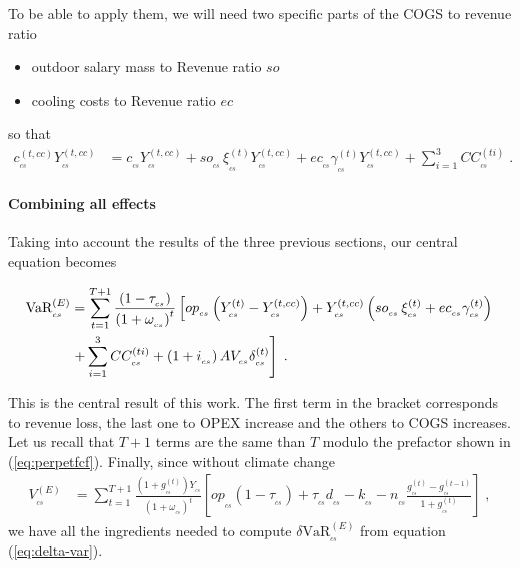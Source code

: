 To be able to apply them, we will need two specific parts of the COGS to revenue ratio
\begin{itemize}
\item[•] outdoor salary mass to Revenue ratio $so$
\item[•] cooling costs to Revenue ratio $ec$
\end{itemize}
so that
\begin{align}
c^{(t,cc)}_{_{cs}}Y^{(t,cc)}_{_{cs}}&=c_{_{cs}}Y^{(t,cc)}_{_{cs}}+so_{_{cs}}\, \xi^{(t)}_{_{cs}} Y^{(t,cc)}_{_{cs}}+ ec_{_{cs}} \gamma^{(t)}_{_{cs}}Y^{(t,cc)}_{_{cs}}
%
+\sum_{i=1}^3CC^{(ti)}_{_{cs}}\;.
\end{align}

\paragraph{Combining all effects}

Taking into account the results of the three previous sections, our central equation becomes

\vspace{0.1cm}

\begin{tcolorbox}[colback=red!5!white,colframe=red!70!black,title=\textbf{ClimVaR central formula},halign title=flush center]
\begin{align}
\text{VaR}^{(E)}_{_{cs}}&=
%
\sum_{t=1}^{T+1}
%
\frac{\left( 1-\tau_{_{cs}}\right)}{\left(1+\omega_{_{cs}}\right)^t}
%
\left[op_{_{cs}}\left(Y^{(t)}_{_{cs}}-Y^{(t,cc)}_{_{cs}}\right)
%
+Y^{(t,cc)}_{_{cs}}\left(so_{_{cs}}\, \xi^{(t)}_{_{cs}} + ec_{_{cs}} \gamma^{(t)}_{_{cs}}\right)
%
\right.\notag\\
%
&\left. +\sum_{i=1}^3CC^{(ti)}_{_{cs}}+\left(1+i_{_{cs}}\right) AV_{_{cs}} \delta^{(t)}_{_{cs}}
%
\right]\;.\label{eq:central2}
\end{align}
\end{tcolorbox}

\vspace{0.1cm}

This is the central result of this work. The first term in the bracket corresponds to revenue loss, the last one to OPEX increase and the others to COGS increases. Let us recall that $T+1$ terms are the same than $T$ modulo the prefactor shown in (\ref{eq:perpetfcf}). Finally, since without climate change
\begin{align}
V^{(E)}_{_{cs}}&=\sum_{t=1}^{T+1}\frac{\left(1+g^{(t)}_{_{cs}}\right)Y_{_{cs}}}{\left(1+\omega_{_{cs}}\right)^t}
%
\left[op_{_{cs}}\left(1-\tau_{_{cs}}\right)+\tau_{_{cs}} d_{_{cs}}-k_{_{cs}}-n_{_{cs}}\frac{g^{(t)}_{_{cs}}-g^{(t-1)}_{_{cs}}}{1+g^{(t)}_{_{cs}}} \right]\;,\label{eq:var-without-cc}
\end{align}
we have all the ingredients needed to compute $\delta \text{VaR}^{(E)}_{_{cs}}$ from equation (\ref{eq:delta-var}).


